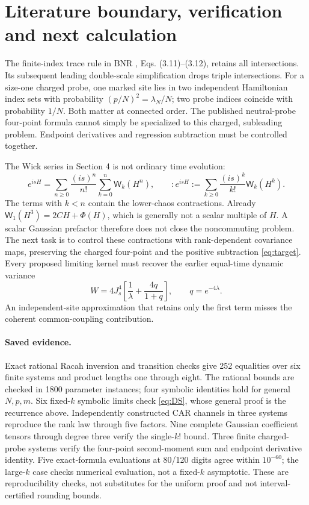 \documentclass[11pt,a4paper]{article}
\newcommand{\W}{\mathsf W}
\begin{document}
\newpage
\section{Literature boundary, verification and next calculation}
The finite-index trace rule in BNR \cite{BNR}, Eqs. (3.11)--(3.12),
retains all intersections. Its subsequent leading double-scale
simplification drops triple intersections. For a size-one charged
probe, one marked site lies in two independent Hamiltonian index
sets with probability $(p/N)^2=\lambda_N/N$; two probe indices
coincide with probability $1/N$. Both matter at connected order.
The published neutral-probe four-point formula cannot simply be
specialized to this charged, subleading problem. Endpoint
derivatives and regression subtraction must be controlled together.

The Wick series in Section 4 is not ordinary time evolution:
\begin{equation}
 e^{isH}=\sum_{n\ge0}\frac{(is)^n}{n!}
          \sum_{k=0}^n\W_k(H^n),
 \qquad
 :e^{isH}:=\sum_{k\ge0}\frac{(is)^k}{k!}\W_k(H^k).
\end{equation}
The terms with $k<n$ contain the lower-chaos contractions.
Already $\W_1(H^3)=2CH+\Phi(H)$, which is generally not a scalar
multiple of $H$. A scalar Gaussian prefactor therefore does not
close the noncommuting problem. The next task is to control these
contractions with rank-dependent covariance maps, preserving the
charged four-point and the positive subtraction \eqref{eq:target}.
Every proposed limiting kernel must recover the earlier equal-time
dynamic variance
\begin{equation}
 W=4J_s^4\left[\frac1\lambda+\frac{4q}{1+q}\right],
 \qquad q=e^{-4\lambda}.
\end{equation}
An independent-site approximation that retains only the first term
misses the coherent common-coupling contribution.

\paragraph{Saved evidence.}
Exact rational Racah inversion and transition checks give 252
equalities over six finite systems and product lengths one through
eight. The rational bounds are checked in 1800 parameter instances;
four symbolic identities hold for general $N,p,m$. Six fixed-$k$
symbolic limits check \eqref{eq:DS}, whose general proof is the
recurrence above. Independently constructed CAR channels in three
systems reproduce the rank law through five factors. Nine complete
Gaussian coefficient tensors through degree three verify the
single-$k!$ bound. Three finite charged-probe systems verify the
four-point second-moment sum and endpoint derivative identity.
Five exact-formula evaluations at 80/120 digits agree within
$10^{-60}$; the large-$k$ case checks numerical evaluation, not a
fixed-$k$ asymptotic. These are reproducibility checks, not substitutes
for the uniform proof and not interval-certified rounding bounds.
\end{document}
